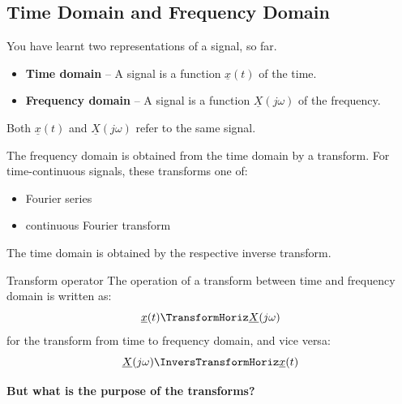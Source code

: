 \begin{refsection}
\subsection{Time Domain and Frequency Domain}

You have learnt two representations of a signal, so far.
\begin{itemize}
	\item {} \textbf{Time domain} -- A signal is a function $\underline{x}(t)$ of the time.
	\item {} \textbf{Frequency domain} -- A signal is a function $\underline{X}(j \omega)$ of the frequency.
\end{itemize}
Both $\underline{x}(t)$ and $\underline{X}(j \omega)$ refer to the same signal. 

The frequency domain is obtained from the time domain by a transform. For time-continuous signals, these transforms one of:
\begin{itemize}
	\item Fourier series
	\item continuous Fourier transform
\end{itemize}
The time domain is obtained by the respective inverse transform.

\begin{definition}{Transform operator}
	The operation of a transform between time and frequency domain is written as:
	\begin{equation}
		\underline{x}(t) \TransformHoriz \underline{X}(j \omega)
	\end{equation}%
	for the transform from time to frequency domain, and vice versa:
	\begin{equation}
		\underline{X}(j \omega) \InversTransformHoriz \underline{x}(t)
	\end{equation}%
\end{definition}

\textbf{But what is the purpose of the transforms?}

\begin{figure}[H]
	\centering
\end{figure}
\end{refsection}
